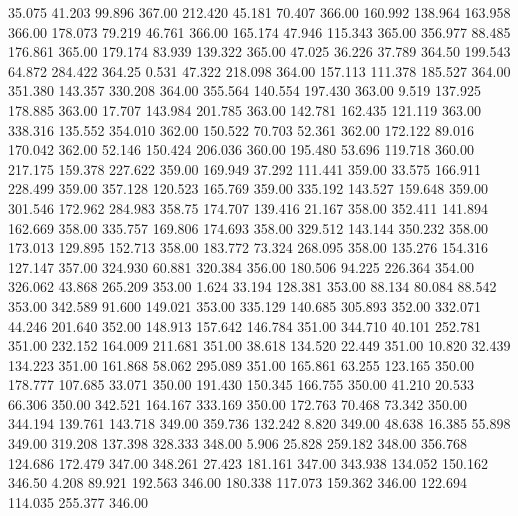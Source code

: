   35.075   41.203   99.896       367.00
 212.420   45.181   70.407       366.00
 160.992  138.964  163.958       366.00
 178.073   79.219   46.761       366.00
 165.174   47.946  115.343       365.00
 356.977   88.485  176.861       365.00
 179.174   83.939  139.322       365.00
  47.025   36.226   37.789       364.50
 199.543   64.872  284.422       364.25
   0.531   47.322  218.098       364.00
 157.113  111.378  185.527       364.00
 351.380  143.357  330.208       364.00
 355.564  140.554  197.430       363.00
   9.519  137.925  178.885       363.00
  17.707  143.984  201.785       363.00
 142.781  162.435  121.119       363.00
 338.316  135.552  354.010       362.00
 150.522   70.703   52.361       362.00
 172.122   89.016  170.042       362.00
  52.146  150.424  206.036       360.00
 195.480   53.696  119.718       360.00
 217.175  159.378  227.622       359.00
 169.949   37.292  111.441       359.00
  33.575  166.911  228.499       359.00
 357.128  120.523  165.769       359.00
 335.192  143.527  159.648       359.00
 301.546  172.962  284.983       358.75
 174.707  139.416   21.167       358.00
 352.411  141.894  162.669       358.00
 335.757  169.806  174.693       358.00
 329.512  143.144  350.232       358.00
 173.013  129.895  152.713       358.00
 183.772   73.324  268.095       358.00
 135.276  154.316  127.147       357.00
 324.930   60.881  320.384       356.00
 180.506   94.225  226.364       354.00
 326.062   43.868  265.209       353.00
   1.624   33.194  128.381       353.00
  88.134   80.084   88.542       353.00
 342.589   91.600  149.021       353.00
 335.129  140.685  305.893       352.00
 332.071   44.246  201.640       352.00
 148.913  157.642  146.784       351.00
 344.710   40.101  252.781       351.00
 232.152  164.009  211.681       351.00
  38.618  134.520   22.449       351.00
  10.820   32.439  134.223       351.00
 161.868   58.062  295.089       351.00
 165.861   63.255  123.165       350.00
 178.777  107.685   33.071       350.00
 191.430  150.345  166.755       350.00
  41.210   20.533   66.306       350.00
 342.521  164.167  333.169       350.00
 172.763   70.468   73.342       350.00
 344.194  139.761  143.718       349.00
 359.736  132.242    8.820       349.00
  48.638   16.385   55.898       349.00
 319.208  137.398  328.333       348.00
   5.906   25.828  259.182       348.00
 356.768  124.686  172.479       347.00
 348.261   27.423  181.161       347.00
 343.938  134.052  150.162       346.50
   4.208   89.921  192.563       346.00
 180.338  117.073  159.362       346.00
 122.694  114.035  255.377       346.00
